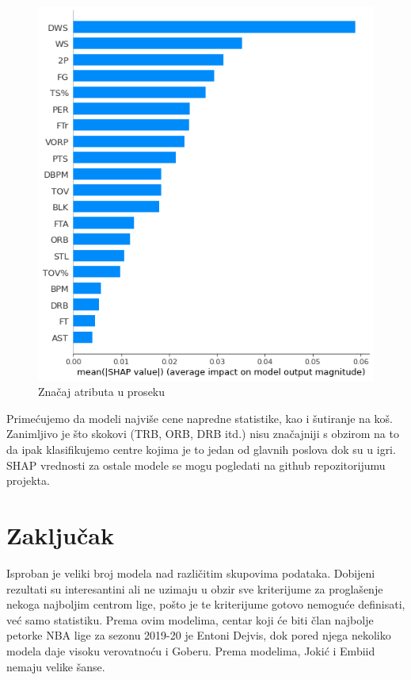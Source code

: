 \documentclass[a4paper]{article}
\begin{document}
\begin{figure}[h!]
\begin{center}
\includegraphics[scale=0.4]{shap_simple_2.png}
\end{center}
\caption{Značaj atributa u proseku}
\label{plt:shap_simple_2}
\end{figure}

Primećujemo da modeli najviše cene napredne statistike, kao i šutiranje na koš. Zanimljivo je što skokovi (TRB, ORB, DRB itd.) nisu značajniji s obzirom na to da ipak klasifikujemo centre kojima je to jedan od glavnih poslova dok su u igri. SHAP vrednosti za ostale modele se mogu pogledati na github repozitorijumu projekta.

\section{Zaključak}
\label{sec:zakljucak}

Isproban je veliki broj modela nad različitim skupovima podataka. Dobijeni rezultati su interesantini ali ne uzimaju u obzir sve kriterijume za proglašenje nekoga najboljim centrom lige, pošto je te kriterijume gotovo nemoguće definisati, već samo statistiku. Prema ovim modelima, centar koji će biti član najbolje petorke NBA lige za sezonu 2019-20 je Entoni Dejvis, dok pored njega nekoliko modela daje visoku verovatnoću i Goberu. Prema modelima, Jokić i Embiid nemaju velike šanse.
\end{document}
